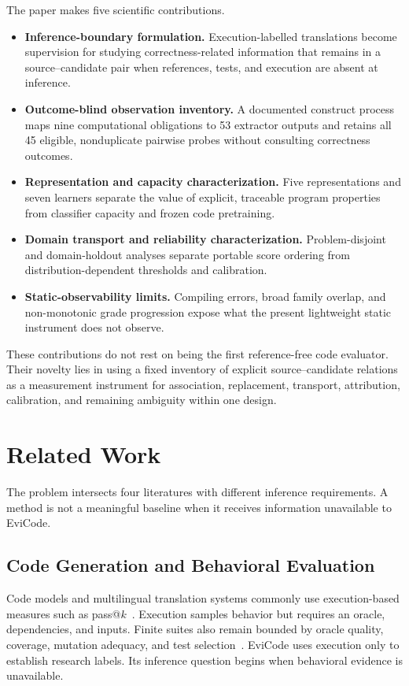 \documentclass[conference]{IEEEtran}
\begin{document}
The paper makes five scientific contributions.
\begin{itemize}
\item \textbf{Inference-boundary formulation.} Execution-labelled translations become supervision for studying correctness-related information that remains in a source--candidate pair when references, tests, and execution are absent at inference.
\item \textbf{Outcome-blind observation inventory.} A documented construct process maps nine computational obligations to 53 extractor outputs and retains all 45 eligible, nonduplicate pairwise probes without consulting correctness outcomes.
\item \textbf{Representation and capacity characterization.} Five representations and seven learners separate the value of explicit, traceable program properties from classifier capacity and frozen code pretraining.
\item \textbf{Domain transport and reliability characterization.} Problem-disjoint and domain-holdout analyses separate portable score ordering from distribution-dependent thresholds and calibration.
\item \textbf{Static-observability limits.} Compiling errors, broad family overlap, and non-monotonic grade progression expose what the present lightweight static instrument does not observe.
\end{itemize}

These contributions do not rest on being the first reference-free code evaluator. Their novelty lies in using a fixed inventory of explicit source--candidate relations as a measurement instrument for association, replacement, transport, attribution, calibration, and remaining ambiguity within one design.

\section{Related Work}
The problem intersects four literatures with different inference requirements. A method is not a meaningful baseline when it receives information unavailable to EviCode.

\subsection{Code Generation and Behavioral Evaluation}
Code models and multilingual translation systems commonly use execution-based measures such as pass@$k$~\cite{chen2021evaluating,roziere2020transcoder,hendrycks2021apps,li2022competition,zheng2023codegeex,cassano2023multiple}. Execution samples behavior but requires an oracle, dependencies, and inputs. Finite suites also remain bounded by oracle quality, coverage, mutation adequacy, and test selection~\cite{barr2015oracle,inozemtseva2014coverage,jia2011mutation,yoo2012regression}. EviCode uses execution only to establish research labels. Its inference question begins when behavioral evidence is unavailable.
\end{document}
